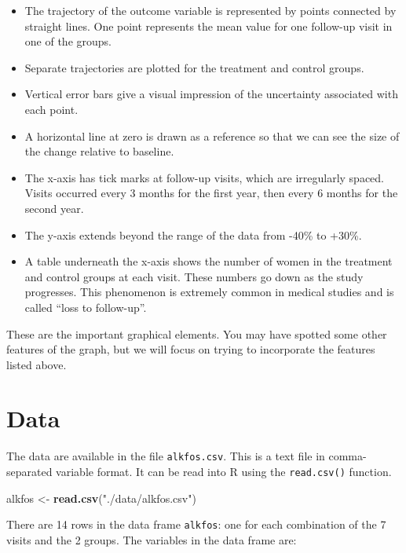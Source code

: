 \documentclass[
]{book}
\newenvironment{Shaded}{\begin{snugshade}}{\end{snugshade}}
\newcommand{\FunctionTok}[1]{\textcolor[rgb]{0.13,0.29,0.53}{\textbf{#1}}}
\newcommand{\NormalTok}[1]{#1}
\newcommand{\OtherTok}[1]{\textcolor[rgb]{0.56,0.35,0.01}{#1}}
\newcommand{\StringTok}[1]{\textcolor[rgb]{0.31,0.60,0.02}{#1}}
\providecommand{\tightlist}{%
  \setlength{\itemsep}{0pt}\setlength{\parskip}{0pt}}
\begin{document}
\begin{itemize}
\tightlist
\item
  The trajectory of the outcome variable is represented by points connected by straight lines. One point represents the mean value for one follow-up visit in one of the groups.
\item
  Separate trajectories are plotted for the treatment and control groups.
\item
  Vertical error bars give a visual impression of the uncertainty associated with each point.
\item
  A horizontal line at zero is drawn as a reference so that we can see the size of the change relative to baseline.
\item
  The x-axis has tick marks at follow-up visits, which are irregularly spaced. Visits occurred every 3 months for the first year, then every 6 months for the second year.
\item
  The y-axis extends beyond the range of the data from -40\% to +30\%.
\item
  A table underneath the x-axis shows the number of women in the treatment and control groups at each visit. These numbers go down as the study progresses. This phenomenon is extremely common in medical studies and is called ``loss to follow-up''.
\end{itemize}

These are the important graphical elements. You may have spotted some other features of the graph, but we will focus on trying to incorporate the features listed above.

\section{Data}\label{data}

The data are available in the file \texttt{alkfos.csv}. This is a text file in comma-separated variable format. It can be read into R using the \texttt{read.csv()} function.

\begin{Shaded}
\begin{Highlighting}[]
\NormalTok{alkfos }\OtherTok{\textless{}{-}} \FunctionTok{read.csv}\NormalTok{(}\StringTok{"./data/alkfos.csv"}\NormalTok{)}
\end{Highlighting}
\end{Shaded}

There are 14 rows in the data frame \texttt{alkfos}: one for each combination of the 7 visits and the 2 groups. The variables in the data frame are:
\end{document}

